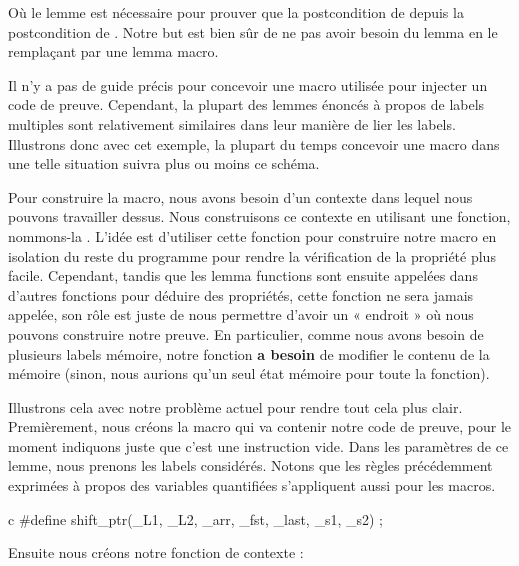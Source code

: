 Où le lemme  est nécessaire pour prouver que la
postcondition de  depuis la postcondition de
. Notre but est bien sûr de ne pas avoir besoin du
lemma en le remplaçant par une lemma macro.


Il n'y a pas de guide précis pour concevoir une macro utilisée pour injecter
un code de preuve. Cependant, la plupart des lemmes énoncés à propos de labels
multiples sont relativement similaires dans leur manière de lier les labels. 
Illustrons donc avec cet exemple, la plupart du temps concevoir une macro dans
une telle situation suivra plus ou moins ce schéma.


Pour construire la macro, nous avons besoin d'un contexte dans lequel nous
pouvons travailler dessus. Nous construisons ce contexte en utilisant une fonction,
nommons-la . L'idée est d'utiliser
cette fonction pour construire notre macro en isolation du reste du programme pour
rendre la vérification de la propriété plus facile. Cependant, tandis que les 
lemma functions sont ensuite appelées dans d'autres fonctions pour déduire des
propriétés, cette fonction ne sera jamais appelée, son rôle est juste de nous
permettre d'avoir un « endroit » où nous pouvons construire notre preuve. En
particulier, comme nous avons besoin de plusieurs labels mémoire, notre fonction
\textbf{a besoin} de modifier le contenu de la mémoire (sinon, nous aurions qu'un
seul état mémoire pour toute la fonction).


Illustrons cela avec notre problème actuel pour rendre tout cela plus clair.
Premièrement, nous créons la macro  qui va contenir notre
code de preuve, pour le moment indiquons juste que c'est une instruction vide.
Dans les paramètres de ce lemme, nous prenons les labels considérés. Notons que
les règles précédemment exprimées à propos des variables quantifiées s'appliquent
aussi pour les macros.


\begin{CodeBlock}{c}
#define shift_ptr(_L1, _L2, _arr, _fst, _last, _s1, _s2) ;
\end{CodeBlock}


Ensuite nous créons notre fonction de contexte :




